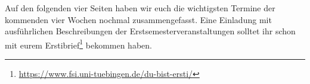Auf den folgenden vier Seiten haben wir euch die wichtigsten Termine der kommenden vier Wochen nochmal zusammengefasst. Eine Einladung mit ausführlichen Beschreibungen der Erstsemesterveranstaltungen solltet ihr schon mit eurem Erstibrief\footnote{\url{https://www.fsi.uni-tuebingen.de/du-bist-ersti/}} bekommen haben.



